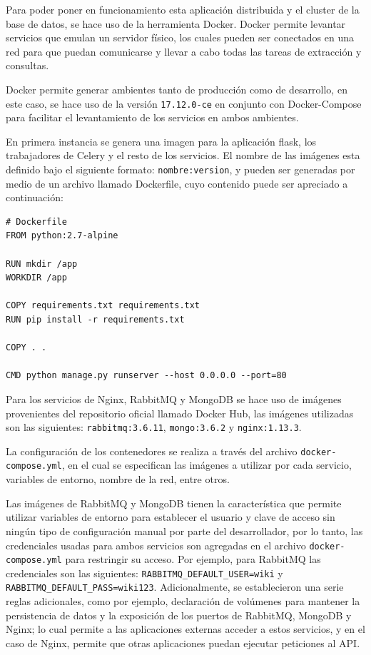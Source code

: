 Para poder poner en funcionamiento esta aplicación distribuida y el cluster de la base de datos, se hace uso de la herramienta Docker.
Docker permite levantar servicios que emulan un servidor físico, los cuales pueden ser conectados en una red para que puedan comunicarse y llevar a cabo todas las tareas de extracción y consultas.

Docker permite generar ambientes tanto de producción como de desarrollo, en este caso, se hace uso de la versión \texttt{17.12.0-ce} en conjunto con Docker-Compose para facilitar el levantamiento de los servicios en ambos ambientes.

En primera instancia se genera una imagen para la aplicación flask, los trabajadores de Celery y el resto de los servicios.
El nombre de las imágenes esta definido bajo el siguiente formato: \texttt{nombre:version}, y pueden ser generadas por medio de un archivo llamado Dockerfile, cuyo contenido puede ser apreciado a continuación:

\begin{lstlisting}[language=docker,caption={Contenido del archivo Dockerfile para la imagen del API},breaklines=true,label={code:dockerfile}]
# Dockerfile
FROM python:2.7-alpine

RUN mkdir /app
WORKDIR /app

COPY requirements.txt requirements.txt
RUN pip install -r requirements.txt

COPY . .

CMD python manage.py runserver --host 0.0.0.0 --port=80
\end{lstlisting}

Para los servicios de Nginx, RabbitMQ y MongoDB se hace uso de imágenes provenientes del repositorio oficial llamado Docker Hub,
las imágenes utilizadas son las siguientes: \texttt{rabbitmq:3.6.11}, \texttt{mongo:3.6.2} y \texttt{nginx:1.13.3}.

La configuración de los contenedores se realiza a través del archivo \texttt{docker-compose.yml}, en el cual se especifican
las imágenes a utilizar por cada servicio, variables de entorno, nombre de la red, entre otros.

Las imágenes de RabbitMQ y MongoDB tienen la característica que permite utilizar variables de entorno para establecer el usuario y clave de acceso sin ningún tipo de configuración manual por parte del desarrollador,
por lo tanto, las credenciales usadas para ambos servicios son agregadas en el archivo \texttt{docker-compose.yml} para restringir su acceso.
Por ejemplo, para RabbitMQ las credenciales son las siguientes: \verb|RABBITMQ_DEFAULT_USER=wiki| y \verb|RABBITMQ_DEFAULT_PASS=wiki123|.
Adicionalmente, se establecieron una serie reglas adicionales, como por ejemplo,
declaración de volúmenes para mantener la persistencia de datos y
la exposición de los puertos de RabbitMQ, MongoDB y Nginx;
lo cual permite a las aplicaciones externas acceder a estos servicios, y en el caso de Nginx, permite que otras aplicaciones puedan ejecutar peticiones al API.

